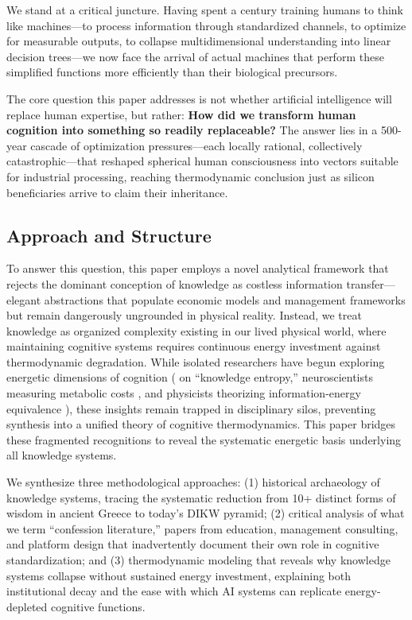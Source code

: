 We stand at a critical juncture. Having spent a century training humans to think like machines---to process information through standardized channels, to optimize for measurable outputs, to collapse multidimensional understanding into linear decision trees---we now face the arrival of actual machines that perform these simplified functions more efficiently than their biological precursors.

The core question this paper addresses is not whether artificial intelligence will replace human expertise, but rather: \textbf{How did we transform human cognition into something so readily replaceable?} The answer lies in a 500-year cascade of optimization pressures—each locally rational, collectively catastrophic—that reshaped spherical human consciousness into vectors suitable for industrial processing, reaching thermodynamic conclusion just as silicon beneficiaries arrive to claim their inheritance.
\subsection{Approach and Structure}

To answer this question, this paper employs a novel analytical framework that rejects the dominant conception of knowledge as costless information transfer—elegant abstractions that populate economic models and management frameworks but remain dangerously ungrounded in physical reality. Instead, we treat knowledge as organized complexity existing in our lived physical world, where maintaining cognitive systems requires continuous energy investment against thermodynamic degradation. While isolated researchers have begun exploring energetic dimensions of cognition (\citet{bratianu2020} on ``knowledge entropy,'' neuroscientists measuring metabolic costs \citep{jamadar2025}, and physicists theorizing information-energy equivalence \citep{stonier1996}), these insights remain trapped in disciplinary silos, preventing synthesis into a unified theory of cognitive thermodynamics. This paper bridges these fragmented recognitions to reveal the systematic energetic basis underlying all knowledge systems.

We synthesize three methodological approaches: (1) historical archaeology of knowledge systems, tracing the systematic reduction from 10+ distinct forms of wisdom in ancient Greece to today's DIKW pyramid; (2) critical analysis of what we term ``confession literature,'' papers from education, management consulting, and platform design that inadvertently document their own role in cognitive standardization; and (3) thermodynamic modeling that reveals why knowledge systems collapse without sustained energy investment, explaining both institutional decay and the ease with which AI systems can replicate energy-depleted cognitive functions.

